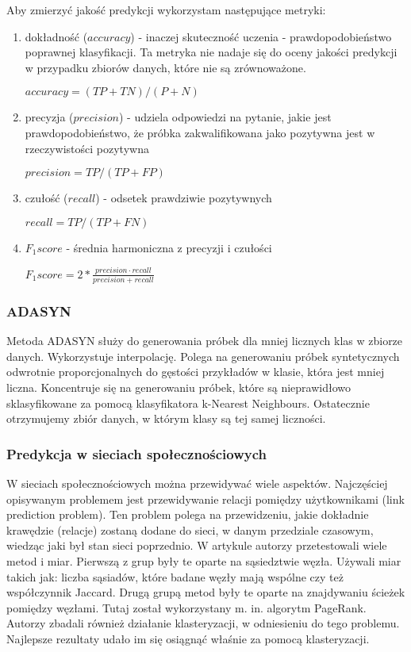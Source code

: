 \documentclass[polish,12pt]{aghthesis}
\begin{document}
\FloatBarrier

Aby zmierzyć jakość predykcji wykorzystam następujące metryki:

\begin{enumerate}
    \item dokładność ($accuracy$) - inaczej skuteczność uczenia - prawdopodobieństwo poprawnej klasyfikacji. Ta metryka nie nadaje się do oceny jakości predykcji w przypadku zbiorów danych, które nie są zrównoważone.
    
    $accuracy = (TP + TN) / (P + N)$
    \item precyzja ($precision$) - udziela odpowiedzi na pytanie, jakie jest prawdopodobieństwo, że próbka zakwalifikowana jako pozytywna jest w rzeczywistości pozytywna
    
    $precision = TP / (TP + FP)$
    \item czułość ($recall$) - odsetek prawdziwie pozytywnych
    
    $recall = TP / (TP+FN)$
     \item $F_1 score$ - średnia harmoniczna z precyzji i czułości
     
     $F_1 score = 2 * \frac{precision \cdot recall}{precision + recall}$
\end{enumerate}

\subsubsection{ADASYN}
Metoda ADASYN\cite{adasyn} służy do generowania próbek dla mniej licznych klas w zbiorze danych. Wykorzystuje interpolację. Polega na generowaniu próbek syntetycznych odwrotnie proporcjonalnych do gęstości przykładów w klasie, która jest mniej liczna. Koncentruje się na generowaniu próbek, które są nieprawidłowo sklasyfikowane za pomocą klasyfikatora k-Nearest Neighbours. Ostatecznie otrzymujemy zbiór danych, w którym klasy są tej samej liczności.


\subsubsection{Predykcja w sieciach społecznościowych}

W sieciach społecznościowych można przewidywać wiele aspektów. Najczęściej opisywanym problemem jest przewidywanie relacji pomiędzy użytkownikami (link prediction problem). Ten problem polega na przewidzeniu, jakie dokładnie krawędzie (relacje) zostaną dodane do sieci, w danym przedziale czasowym, wiedząc jaki był stan sieci poprzednio. W artykule\cite{link1} autorzy przetestowali wiele metod i miar. Pierwszą z grup były te oparte na sąsiedztwie węzła. Używali miar takich jak: liczba sąsiadów, które badane węzły mają wspólne czy też współczynnik Jaccard. Drugą grupą metod były te oparte na znajdywaniu ścieżek pomiędzy węzłami. Tutaj został wykorzystany m. in. algorytm PageRank. Autorzy zbadali również działanie klasteryzacji, w odniesieniu do tego problemu. Najlepsze rezultaty udało im się osiągnąć właśnie za pomocą klasteryzacji. 
\end{document}
